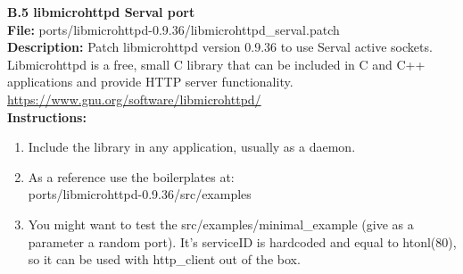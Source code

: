 \newpage
{}
{}
{\huge \bf \noindent B.5 libmicrohttpd Serval port}\\[0.5cm]
\textbf{File:} ports/libmicrohttpd-0.9.36/libmicrohttpd\_serval.patch\\
\textbf{Description:} Patch libmicrohttpd version 0.9.36 to use Serval active sockets. Libmicrohttpd is a free, small C library that can be included in C and C++ applications and provide HTTP server functionality.\\
\url{https://www.gnu.org/software/libmicrohttpd/}\\
\textbf{Instructions: }
\begin{enumerate} \itemsep1pt \parskip0pt 
	\item Include the library in any application, usually as a daemon.
	\item As a reference use the boilerplates at:\\
	ports/libmicrohttpd-0.9.36/src/examples
	\item You might want to test the src/examples/minimal\_example (give as a parameter a random port). It's serviceID is hardcoded and equal to htonl(80), so it can be used with http\_client out of the box.\\[0.5cm]
\end{enumerate}
